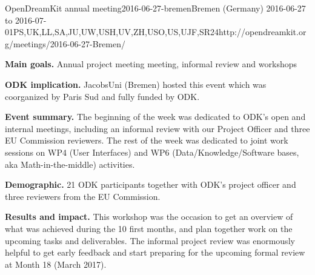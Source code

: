 \begin{event}{OpenDreamKit annual meeting}{2016-06-27-bremen}{Bremen (Germany) 2016-06-27 to 2016-07-01}{PS,UK,LL,SA,JU,UW,USH,UV,ZH,USO,US,UJF,SR}{24}{http://opendreamkit.org/meetings/2016-06-27-Bremen/}

  \textbf{Main goals.} Annual project meeting meeting, informal review and workshops

  \textbf{ODK implication.} JacobsUni (Bremen) hosted this event which
  was coorganized by Paris Sud and fully funded by ODK.

  \textbf{Event summary.} The beginning of the week was dedicated to
  ODK’s open and internal meetings, including an informal review with
  our Project Officer and three EU Commission reviewers. The rest of
  the week was dedicated to joint work sessions on WP4 (User
  Interfaces) and WP6 (Data/Knowledge/Software bases, aka
  Math-in-the-middle) activities.

  \textbf{Demographic.} 21 ODK participants together with ODK's
  project officer and three reviewers from the EU Commission.

  \textbf{Results and impact.} This workshop was the occasion to get
  an overview of what was achieved during the 10 first months, and
  plan together work on the upcoming tasks and deliverables. The
  informal project review was enormously helpful to get early feedback
  and start preparing for the upcoming formal review at Month 18
  (March 2017).


\end{event}
